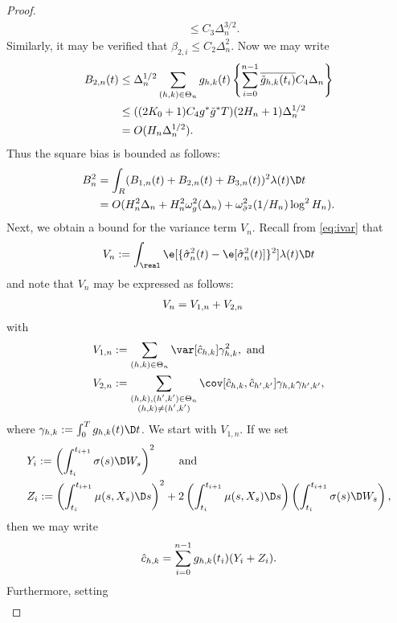\begin{appendices}
\begin{proof}
\begin{align}
& \le C_3 \Delta_n^{3/2}.
  \label{}
\end{align}
Similarly, it may be verified that $\beta_{2,i} \le C_2 \Delta_n^2$. Now we may write
\begin{align}
  B_{2,n}(t) &\le \Delta_n^{1/2}\sum_{(h,k) \in \Theta_n} g_{h,k}(t)\left\{ \sum_{i=0}^{n-1} \overline{\tilde{g}_{h,k}(t_i)} C_4 \Delta_n \right\} \notag \\
  & \le ( (2K_0+1)C_4 g^*\tilde{g}^* T) (2H_n + 1)\Delta^{1/2}_n\notag\\
  & = O(H_n \Delta^{1/2}_n).
  \label{}
\end{align}
Thus the square bias is bounded as follows:
\begin{align}
  B^2_n &= \int_R (B_{1,n}(t) + B_{2,n}(t)+  B_{3,n}(t))^2 \lambda(t) \D t \notag\\
  &= O(H_n^2 \Delta_n + H^2_n\omega^2_g(\Delta_n)  + \omega^2_{\bsv}(1/H_n)\log^2H_n).
  \label{}
\end{align}
Next, we obtain a  bound for the variance term $V_n$. Recall from \eqref{eq:ivar} that
\begin{align}
V_n :=  \int_\real \e[\{\svn(t) - \e[\svn(t)]\}^2] \lambda(t) \D t \notag
\end{align}
and note that $V_n$ may be expressed as follows:
\begin{align}
  V_n & = V_{1,n} + V_{2,n} \notag
\end{align}
with
\begin{align}
  & V_{1,n} := \sum_{(h,k) \in \Theta_n}\var[\cnhk]\gamma_{h,k}^2,\text{ and} \notag\\ 
& V_{2,n} := \mathop{\sum}_{\substack{(h,k),(h',k') \in \Theta_n\\(h,k) \ne (h',k')}} \cov[\cnhk, \hat{c}_{h',k'}] \gamma_{h,k} \gamma_{h',k'},\notag
  \label{}
\end{align}
where $\gamma_{h,k} : = \int_0^T g_{h,k}(t) \D t$.  We start with $V_{1,n}$. If we set 
\begin{align}
  &Y_i := \left(\int^{t_{i+1}}_{t_i} \sigma(s) \D W_s\right)^2  \qquad \text{and} \notag\\
  &Z_i := \left(\int^{t_{i+1}}_{t_i} \mu(s, X_s) \D s\right)^2 + 2\left(\int^{t_{i+1}}_{t_i} \mu(s,X_s) \D s\right)\left(\int^{t_{i+1}}_{t_i} \sigma(s) \D W_s\right), \notag 
  \label{}
\end{align}
then we may write 
\begin{align}
  \hat{c}_{h,k} = \sum_{i = 0}^{n-1} g_{h,k}(t_i) (Y_i + Z_i).\notag
  \label{}
\end{align}
Furthermore, setting
\begin{align}

\end{align}
\end{proof}
\end{appendices}
